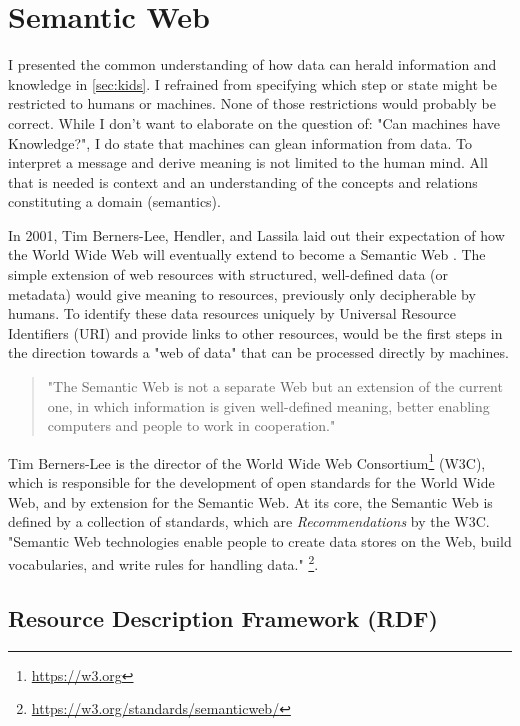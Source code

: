 \documentclass[a4paper,english,twoside,BCOR1.5cm,headsepline,DIV12,appendixprefix,final,12pt]{scrbook}
\newcommand\footnoteurl[1]{\footnote{\scriptsize\url{#1}}}
\begin{document}
\pagebreak
\section{Semantic Web}
\label{sec:semweb}

I presented the common understanding of how data can herald information and knowledge in \cref{sec:kids}. I refrained from specifying which step or state might be restricted to humans or machines. None of those restrictions would probably be correct. While I don't want to elaborate on the question of: "Can machines have Knowledge?", I do state that machines can glean information from data. To interpret a message and derive meaning is not limited to the human mind. All that is needed is context and an understanding of the concepts and relations constituting a domain (semantics).

In 2001, Tim Berners-Lee, Hendler, and Lassila laid out their expectation of how the World Wide Web will eventually extend to become a Semantic Web \cite{Semweb1}. The simple extension of web resources with structured, well-defined data (or metadata) would give meaning to resources, previously only decipherable by humans. To identify these data resources uniquely by Universal Resource Identifiers (URI) and provide links to other resources, would be the first steps in the direction towards a "web of data" \cite{Semweb1} that can be processed directly by machines.

\begin{quote}
"The Semantic Web is not a separate Web but an extension of the current one, in which information is given well-defined meaning, better enabling
computers and people to work in cooperation." \cite{Semweb1}
\end{quote}

Tim Berners-Lee is the director of the World Wide Web Consortium\footnoteurl{https://w3.org} (W3C), which is responsible for the development of open standards for the World Wide Web, and by extension for the Semantic Web. At its core, the Semantic Web is defined by a collection of standards, which are \textit{Recommendations} by the W3C. "Semantic Web technologies enable people to create data stores on the Web, build vocabularies, and write rules for handling data." \footnoteurl{https://w3.org/standards/semanticweb/}.

\subsection{Resource Description Framework (RDF)}
\label{sec:rdf}
\end{document}
